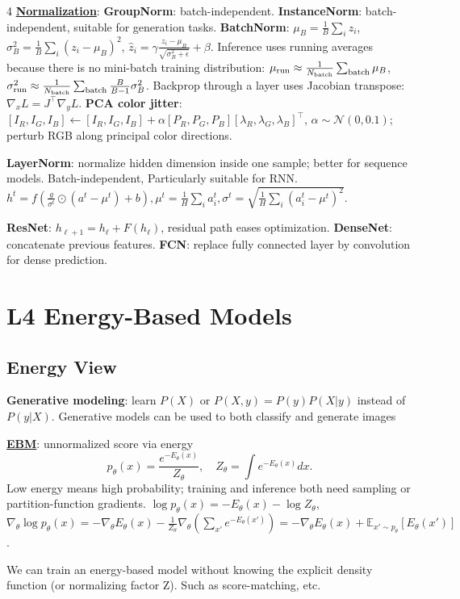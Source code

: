 \documentclass{article}
\newcommand{\key}[1]{\textbf{#1}}
\newcommand{\lowterm}[1]{\textbf{\underline{#1}}}
\newcommand{\E}{\mathbb{E}}
\newcommand{\N}{\mathcal{N}}
\newcommand{\1}{\mathbf 1}
\begin{document}
\begin{multicols*}{4}
\lowterm{Normalization}: \key{GroupNorm}: batch-independent. \key{InstanceNorm}: batch-independent, suitable for generation tasks. 
\key{BatchNorm}: $\mu_B=\frac1B\sum_i z_i$, $\sigma_B^2=\frac1B\sum_i(z_i-\mu_B)^2$,
\(
\hat z_i=\gamma\frac{z_i-\mu_B}{\sqrt{\sigma_B^2+\epsilon}}+\beta.
\)
Inference uses running averages because there is no mini-batch training distribution: $\mu_{\rm run}\approx\frac1{N_{\rm batch}}\sum_{\rm batch}\mu_B$, $\sigma_{\rm run}^2\approx\frac1{N_{\rm batch}}\sum_{\rm batch}\frac{B}{B-1}\sigma_B^2$.
Backprop through a layer uses Jacobian transpose: $\nabla_xL=J^\top\nabla_yL$.
\key{PCA color jitter}: $[I_R,I_G,I_B]\leftarrow[I_R,I_G,I_B]+\alpha[P_R,P_G,P_B][\lambda_R,\lambda_G,\lambda_B]^\top$, $\alpha\sim\N(0,0.1)$; perturb RGB along principal color directions.

\key{LayerNorm}: normalize hidden dimension inside one sample; better for sequence models.  Batch-independent, Particularly suitable for RNN. $h^t=f\left(\frac{g}{\sigma^t}\odot(a^t-\mu^t)+b\right), \mu^t=\frac{1}{H}\sum_i a_i^t, \sigma^t=\sqrt{\frac{1}{H}\sum_i (a_i^t-\mu^t)^2}$.  


\key{ResNet}: $h_{\ell+1}=h_\ell+F(h_\ell)$, residual path eases optimization. \key{DenseNet}: concatenate previous features. \key{FCN}: replace fully connected layer by convolution for dense prediction.

\section{L4 Energy-Based Models}
\subsection{Energy View}
\key{Generative modeling}: learn $P(X)$ or $P(X,y)=P(y)P(X|y)$ instead of $P(y|X)$.  Generative models can be used to both classify and generate images

\lowterm{EBM}: unnormalized score via energy
\[
p_\theta(x)=\frac{e^{-E_\theta(x)}}{Z_\theta},\quad Z_\theta=\int e^{-E_\theta(x)}dx.
\]
Low energy means high probability; training and inference both need sampling or partition-function gradients. $\log p_\theta(x)=-E_\theta(x)-\log Z_\theta$, $\nabla_\theta\log p_\theta(x)=-\nabla_\theta E_\theta(x)-\frac{1}{Z_\theta}\nabla_\theta \left(\sum_{x'} e^{-E_\theta(x')}\right)=-\nabla_\theta E_\theta(x)+\E_{x'\sim p_\theta}[E_\theta(x')]$. 

We can train an energy-based model without knowing the explicit density function
(or normalizing factor Z). Such as score-matching, etc.


\end{multicols*}
\end{document}
